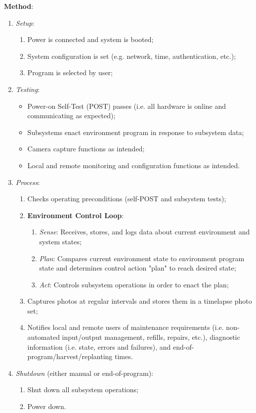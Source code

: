 \textbf{Method}:
\begin{enumerate}
    \item \textit{Setup}:
    \begin{enumerate}
        \item Power is connected and system is booted;
        \item System configuration is set (e.g. network, time, authentication, etc.);
        \item Program is selected by user;
    \end{enumerate}
    \item \textit{Testing}:
    \begin{itemize}
        \item Power-on Self-Test (POST) passes (i.e. all hardware is online and communicating as expected);
        \item Subsystems enact environment program in response to subsystem data;
        \item Camera capture functions as intended;
        \item Local and remote monitoring and configuration functions as intended.
    \end{itemize}
    \item \textit{Process}:
    \begin{enumerate}
        \item Checks operating preconditions (self-POST and subsystem tests);
        \item \textbf{Environment Control Loop}:
        \begin{enumerate}
            \item \textit{Sense}: Receives, stores, and logs data about current environment and system states;
            \item \textit{Plan}: Compares current environment state to environment program state and determines control action "plan" to reach desired state;
            \item \textit{Act}: Controls subsystem operations in order to enact the plan;
        \end{enumerate}
        \item Captures photos at regular intervals and stores them in a timelapse photo set;
        \item Notifies local and remote users of maintenance requirements (i.e. non-automated input/output management, refills, repairs, etc.), diagnostic information (i.e. state, errors and failures), and end-of-program/harvest/replanting times.
    \end{enumerate}
    \item \textit{Shutdown} (either manual or end-of-program):
    \begin{enumerate}
        \item Shut down all subsystem operations;
        \item Power down.
    \end{enumerate}
\end{enumerate}

